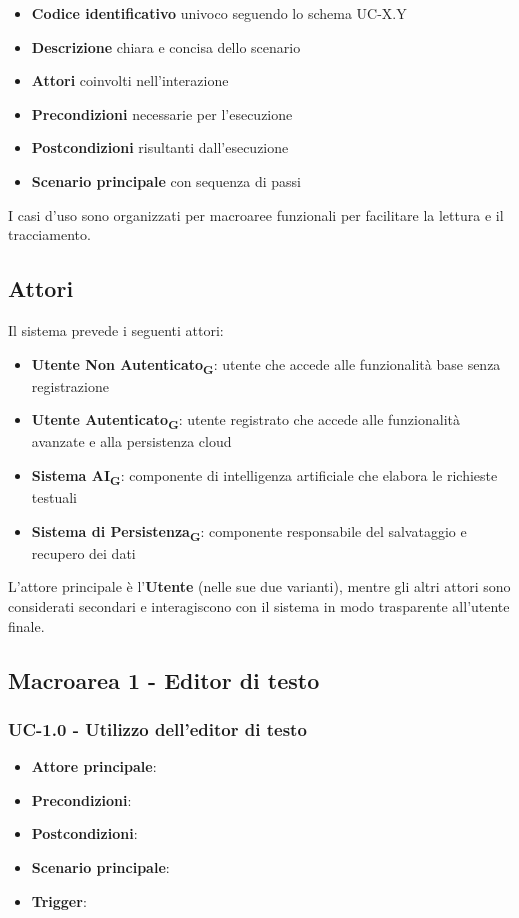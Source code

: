 \documentclass[11pt,a4paper]{article}
\begin{document}
\begin{itemize}
    \item \textbf{Codice identificativo} univoco seguendo lo schema UC-X.Y
    \item \textbf{Descrizione} chiara e concisa dello scenario
    \item \textbf{Attori} coinvolti nell'interazione
    \item \textbf{Precondizioni} necessarie per l'esecuzione
    \item \textbf{Postcondizioni} risultanti dall'esecuzione
    \item \textbf{Scenario principale} con sequenza di passi
\end{itemize}

I casi d'uso sono organizzati per macroaree funzionali per facilitare la lettura e il tracciamento.

\subsection{Attori}
Il sistema prevede i seguenti attori:

\begin{itemize}
    \item \textbf{Utente Non Autenticato\textsubscript{G}}: utente che accede alle funzionalità base senza registrazione
    \item \textbf{Utente Autenticato\textsubscript{G}}: utente registrato che accede alle funzionalità avanzate e alla persistenza cloud
    \item \textbf{Sistema AI\textsubscript{G}}: componente di intelligenza artificiale che elabora le richieste testuali
    \item \textbf{Sistema di Persistenza\textsubscript{G}}: componente responsabile del salvataggio e recupero dei dati
\end{itemize}

L'attore principale è l'\textbf{Utente} (nelle sue due varianti), mentre gli altri attori sono considerati secondari e interagiscono con il sistema in modo trasparente all'utente finale.


\subsection{Macroarea 1 - Editor di testo}
\subsubsection{UC-1.0 - Utilizzo dell'editor di testo}
\begin{itemize}
    \item \textbf{Attore principale}: 
    \item \textbf{Precondizioni}: 
    \item \textbf{Postcondizioni}: 
    \item \textbf{Scenario principale}: 
    \item \textbf{Trigger}: 
\end{itemize}
\end{document}
